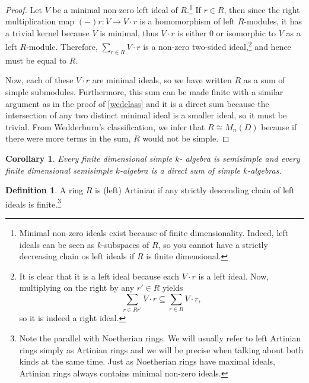 \documentclass{tufte-handout} %
\newtheorem{cor}[thm]{Corollary}
\theoremstyle{definition}
\newtheorem{defn}[thm]{Definition}
\theoremstyle{remark}
\begin{document}
\begin{proof}
	Let $V$ be a minimal non-zero left ideal of $R$.\footnote{Minimal non-zero ideals exist because of finite dimensionality. Indeed, left ideals can be seen as $k$-subspaces of $R$, so you cannot have a strictly decreasing chain os left ideals if $R$ is finite dimensional.} If $r \in R$, then since the right multiplication map $(-)r : V \rightarrow V\cdot r$ is a homomorphism of left $R$-modules, it has a trivial kernel because $V$ is minimal, thus $V\cdot r$ is either $0$ or isomorphic to $V$ as a left $R$-module. Therefore, $\sum_{r \in R} V\cdot r$ is a non-zero two-sided ideal,\footnote{It is clear that it is a left ideal because each $V\cdot r$ is a left ideal. Now, multiplying on the right by any $r' \in R$ yields \[\sum_{r \in Rr'} V\cdot r \subseteq \sum_{r \in R} V\cdot r,\] so it is indeed a right ideal.} and hence must be equal to $R$. 
	
	Now, each of these $V\cdot r$ are minimal ideals, so we have written $R$ as a sum of simple submodules. Furthermore, this sum can be made finite with a similar argument as in the proof of \ref{wedclass} and it is a direct sum because the intersection of any two distinct minimal ideal is a smaller ideal, so it must be trivial. From Wedderburn's classification, we infer that $R \cong M_n(D)$ because if there were more terms in the sum, $R$ would not be simple.
\end{proof}
\begin{cor}
	Every finite dimensional simple $k$- algebra is semisimple and every finite dimensional semisimple $k$-algebra is a direct sum of simple $k$-algebras. %
\end{cor}
\begin{defn}
	A ring $R$ is (left) Artinian if any strictly descending chain of left ideals is finite.\footnote{Note the parallel with Noetherian rings. We will usually refer to left Artinian rings simply as Artinian rings and we will be precise when talking about both kinds at the same time. Just as Noetherian rings have maximal ideals, Artinian rings always contains minimal non-zero ideals.}
\end{defn}
\end{document}

